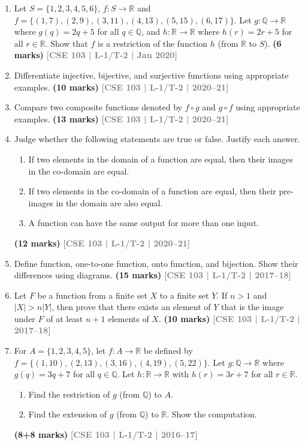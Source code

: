 \documentclass[12pt,a3paper]{article}
\newcommand{\yr}[1]{\hfill\textcolor{gray}{\small\textbf{[#1]}}}
\newcommand{\mk}[1]{\textcolor{orange!70!black}{\small\textbf{(#1 marks)}}}
\begin{document}
\begin{enumerate}
\item Let $S = \{1,2,3,4,5,6\}$, $f: S \to \mathbb{R}$ and $f = \{(1,7),(2,9),(3,11),(4,13),(5,15),(6,17)\}$. Let $g: \mathbb{Q} \to \mathbb{R}$ where $g(q) = 2q + 5$ for all $q \in \mathbb{Q}$, and $h: \mathbb{R} \to \mathbb{R}$ where $h(r) = 2r + 5$ for all $r \in \mathbb{R}$. Show that $f$ is a restriction of the function $h$ (from $\mathbb{R}$ to $S$).
\mk{6} \yr{CSE 103 | L-1/T-2 | Jan 2020}

\item Differentiate injective, bijective, and surjective functions using appropriate examples.
\mk{10} \yr{CSE 103 | L-1/T-2 | 2020--21}

\item Compare two composite functions denoted by $f \circ g$ and $g \circ f$ using appropriate examples.
\mk{13} \yr{CSE 103 | L-1/T-2 | 2020--21}

\item Judge whether the following statements are true or false. Justify each answer.
\begin{enumerate}
  \item If two elements in the domain of a function are equal, then their images in the co-domain are equal.
  \item If two elements in the co-domain of a function are equal, then their pre-images in the domain are also equal.
  \item A function can have the same output for more than one input.
\end{enumerate}
\mk{12} \yr{CSE 103 | L-1/T-2 | 2020--21}

\item Define function, one-to-one function, onto function, and bijection. Show their differences using diagrams.
\mk{15} \yr{CSE 103 | L-1/T-2 | 2017--18}

\item Let $F$ be a function from a finite set $X$ to a finite set $Y$. If $n > 1$ and $|X| > n|Y|$, then prove that there exists an element of $Y$ that is the image under $F$ of at least $n+1$ elements of $X$.
\mk{10} \yr{CSE 103 | L-1/T-2 | 2017--18}  

\item For $A = \{1,2,3,4,5\}$, let $f: A \to \mathbb{R}$ be defined by $f = \{(1,10),(2,13),(3,16),(4,19),(5,22)\}$. Let $g: \mathbb{Q} \to \mathbb{R}$ where $g(q) = 3q + 7$ for all $q \in \mathbb{Q}$. Let $h: \mathbb{R} \to \mathbb{R}$ with $h(r) = 3r + 7$ for all $r \in \mathbb{R}$.
\begin{enumerate}
  \item Find the restriction of $g$ (from $\mathbb{Q}$) to $A$.
  \item Find the extension of $g$ (from $\mathbb{Q}$) to $\mathbb{R}$. Show the computation.
\end{enumerate}
\mk{8+8} \yr{CSE 103 | L-1/T-2 | 2016--17}


\end{enumerate}
\end{document}
